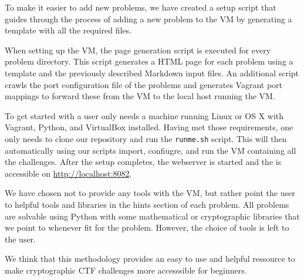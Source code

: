 To make it easier to add new problems, we have created a setup script
that guides through the process of adding a new problem to the VM by
generating a template with all the required files.

When setting up the VM, the page generation script is executed for
every problem directory. This script generates a HTML page for each
problem using a template and the previously described Markdown input
files. An additional script crawls the port configuration file of the
problems and generates Vagrant port mappings to forward these from the
VM to the local host running the VM.

To get started with \cvm{} a user only needs a machine running Linux or
OS X with Vagrant, Python, and VirtualBox installed. Having met those
requirements, one only needs to clone our repository and run the
\verb|runme.sh| script. This will then automatically using our scripts
import, confiugre, and run the VM containing all the challenges. After
the setup completes, the webserver is started and the \cvm{} is
accessible on \url{http://localhost:8082}.

We have chosen not to provide any tools with the VM, but rather point
the user to helpful tools and libraries in the hints section of each
problem. All problems are solvable using Python with some mathematical
or cryptographic libraries that we point to whenever fit for the
problem. However, the choice of tools is left to the user.

We think that this methodology provides an easy to use and helpful
ressource to make cryptographic CTF challenges more accesssible for
beginners.
